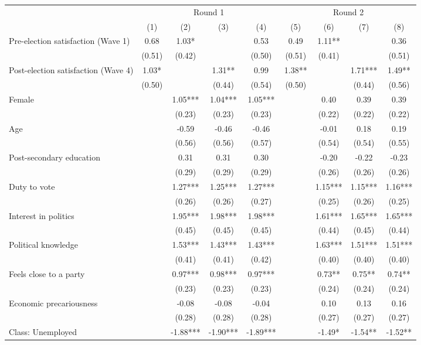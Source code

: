 \begin{tabular}[t]{lcccccccc}
\toprule
  & \multicolumn{4}{c|}{Round 1} & \multicolumn{4}{c}{Round 2} \\
  & (1) & (2) & (3) & (4) & (5) & (6) & (7) & (8) \\
\midrule
Pre-election satisfaction (Wave 1) & 0.68 & 1.03* &  & 0.53 & 0.49 & 1.11** &  & 0.36\\
 & (0.51) & (0.42) &  & (0.50) & (0.51) & (0.41) &  & (0.51)\\
Post-election satisfaction (Wave 4) & 1.03* &  & 1.31** & 0.99 & 1.38** &  & 1.71*** & 1.49**\\
 & (0.50) &  & (0.44) & (0.54) & (0.50) &  & (0.44) & (0.56)\\
Female &  & 1.05*** & 1.04*** & 1.05*** &  & 0.40 & 0.39 & 0.39\\
 &  & (0.23) & (0.23) & (0.23) &  & (0.22) & (0.22) & (0.22)\\
Age &  & -0.59 & -0.46 & -0.46 &  & -0.01 & 0.18 & 0.19\\
 &  & (0.56) & (0.56) & (0.57) &  & (0.54) & (0.54) & (0.55)\\
Post-secondary education &  & 0.31 & 0.31 & 0.30 &  & -0.20 & -0.22 & -0.23\\
 &  & (0.29) & (0.29) & (0.29) &  & (0.26) & (0.26) & (0.26)\\
Duty to vote &  & 1.27*** & 1.25*** & 1.27*** &  & 1.15*** & 1.15*** & 1.16***\\
 &  & (0.26) & (0.26) & (0.27) &  & (0.25) & (0.26) & (0.25)\\
Interest in politics &  & 1.95*** & 1.98*** & 1.98*** &  & 1.61*** & 1.65*** & 1.65***\\
 &  & (0.45) & (0.45) & (0.45) &  & (0.44) & (0.45) & (0.44)\\
Political knowledge &  & 1.53*** & 1.43*** & 1.43*** &  & 1.63*** & 1.51*** & 1.51***\\
 &  & (0.41) & (0.41) & (0.42) &  & (0.40) & (0.40) & (0.40)\\
Feels close to a party &  & 0.97*** & 0.98*** & 0.97*** &  & 0.73** & 0.75** & 0.74**\\
 &  & (0.23) & (0.23) & (0.23) &  & (0.24) & (0.24) & (0.24)\\
Economic  precariousness &  & -0.08 & -0.08 & -0.04 &  & 0.10 & 0.13 & 0.16\\
 &  & (0.28) & (0.28) & (0.28) &  & (0.27) & (0.27) & (0.27)\\
Class: Unemployed &  & -1.88*** & -1.90*** & -1.89*** &  & -1.49* & -1.54** & -1.52**\\

\end{tabular}
